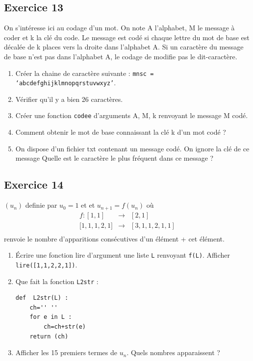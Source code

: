 \documentclass[10pt,fleqn]{article} %
\begin{document}
\begin{multicols}{2}
\subsection*{Exercice 13}

On s’intéresse ici au codage d’un mot. On note A l’alphabet, M le message à coder et k la clé du code. Le message est codé si chaque lettre du mot de base est décalée de k places vers la droite dans l’alphabet A.
Si un caractère du message de base n’est pas dans l’alphabet A, le codage de modifie pas le dit-caractère.

\begin{enumerate}
\item Créer la chaine de caractère suivante : \texttt{mnsc = ‘abcdefghijklmnopqrstuvwxyz’}.
\item Vérifier qu’il y a bien 26 caractères.
\item Créer une fonction \texttt{codee} d’arguments A, M, k renvoyant le message M codé.
\item Comment obtenir le mot de base connaissant la clé k d’un mot codé ?
\item On dispose d’un fichier txt contenant un message codé. On ignore la clé de ce message
Quelle est le caractère le plus fréquent dans ce message ?
\end{enumerate}

\subsection*{Exercice 14}
$(u_n)$ definie par $u_0=1$ et et $u_{n+1}= f(u_n)$ où 
$$
\begin{array}{rcl}
f : [1,1] & \rightarrow  & [2,1] \\
\big[  1,1,1,2,1 \big]  & \rightarrow &  [3,1,1,2,1,1] \\
\end{array}
$$
renvoie le nombre d'apparitions consécutives d'un élément + cet élément.
\begin{enumerate}
\item Écrire une fonction lire d'argument une liste \texttt{L} renvoyant \texttt{f(L)}. Afficher \texttt{lire([1,1,2,2,1])}.
\item Que fait la fonction \texttt{L2str} :
\begin{lstlisting}
def  L2str(L) :
    ch='' ''
    for e in L :
        ch=ch+str(e)
    return (ch)
\end{lstlisting}
\item Afficher les 15 premiers termes de $u_n$. Quels nombres apparaissent ?
\end{enumerate}



\end{multicols}
\end{document}
